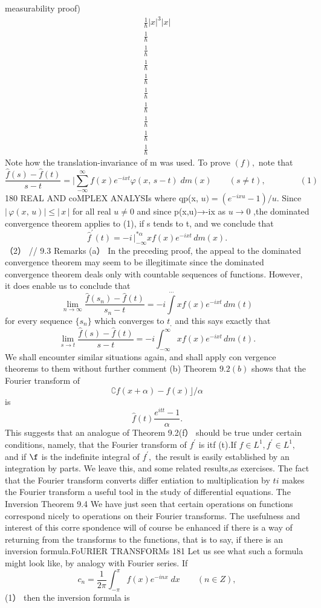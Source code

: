 measurability proof) $$ \begin{array}{l}{{\frac{1}{\hbar}|x|^{3}|x|}}\\ {{\frac{1}{\hbar}}}\\ {{\frac{1}{\hbar}}}\\ {{\frac{1}{\hbar}}}\\ {{\frac{1}{\hbar}}}\\ {{\frac{1}{\hbar}}}\\ {{\frac{1}{\hbar}}}\\ {{\frac{1}{\hbar}}}\\ {{\frac{1}{\hbar}}}\\ {{\frac{1}{\hbar}}}\end{array} $$ Note how the translation-invariance of m was used. To prove $(f),$ note that $$ {\frac{{\hat{f}}(s)-{\hat{f}}(t)}{s-t}}= |\sum_{-\infty}^{\infty}f(x)e^{-i x t}\varphi(x,\,s-t)\;d m(x)\qquad(s\neq t),\qquad\qquad(1) $$180 REAL AND coMPLEX ANALYSIs where qp(x, $u)=(e^{-i x u}-1)/u.$ Since $|\,\varphi(x,\,u)|\leq|\,x\,|$ for all real $u\neq0$ and since p(x,u)→-ix as $u\to0$ ,the dominated convergence theorem applies to (1), if s tends to t, and we conclude that $$ \hat{f}^{\prime}(t)=\left.-i\,\right|_{-\infty}^{\ast\alpha}x f(x)e^{-i x t}\,d m(x). $$ （2） // 9.3 Remarks (a） In the preceding proof, the appeal to the dominated convergence theorem may seem to be illegitimate since the dominated convergence theorem deals only with countable sequences of functions. However, it does enable us to conclude that $$ \operatorname*{lim}_{n\to\infty}{\frac{{\hat{f}}(s_{n})-{\hat{f}}(t)}{s_{n}-t}}=-i\left.\right.{\stackrel{\cdots}{\int}}x f(x)e^{-i x t}\,d m(t) $$ for every sequence $\{s_{n}\}$ which converges to $t_{\mathrm{,}}$ and this says exactly that $$ \operatorname*{lim}_{s\to t}{\frac{{\hat{f}}(s)-{\hat{f}}(t)}{s-t}}=-i\int_{-\infty}^{\infty}x f(x)e^{-i x t}\,d m(t). $$ We shall encounter similar situations again, and shall apply con vergence theorems to them without further comment (b) Theorem $9.2(b)$ shows that the Fourier transform of $$ \complement f(x+\alpha)-f(x)\rfloor/\alpha $$ is $$ {\hat{f}}(t){\frac{e^{i t t}-1}{\alpha}}. $$ This suggests that an analogue of Theorem 9.2(f） should be true under certain conditions, namely, that the Fourier transform of $f^{\prime}$ is itf (t).If $f\in L^{1},f^{\prime}\in L^{1},$ and if $\boldsymbol{\f}$ is the indefinite integral of $f^{\prime},$ the result is easily established by an integration by parts. We leave this, and some related results,as exercises. The fact that the Fourier transform converts differ entiation to multiplication by $t i$ makes the Fourier transform a useful tool in the study of differential equations. The Inversion Theorem 9.4 We have just seen that certain operations on functions correspond nicely to operations on their Fourier transforms. The usefulness and interest of this corre spondence will of course be enhanced if there is a way of returning from the transforms to the functions, that is to say, if there is an inversion formula.FoURIER TRANSFORMs 181 Let us see what such a formula might look like, by analogy with Fourier series. If $$ c_{n}={\frac{1}{2\pi}}\int_{-\pi}^{\pi}f(x)e^{-i n x}\;d x\qquad(n\in Z), $$ (1） then the inversion formula is $$ 
